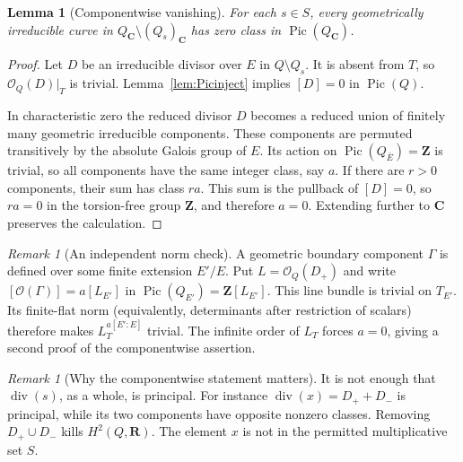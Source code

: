\documentclass[11pt,a4paper]{article}
\newtheorem{lemma}[theorem]{Lemma}
\theoremstyle{remark}
\newtheorem{remark}[theorem]{Remark}
\newcommand{\Z}{\mathbf Z}
\newcommand{\R}{\mathbf R}
\newcommand{\C}{\mathbf C}
\newcommand{\OO}{\mathcal O}
\newcommand{\Pic}{\operatorname{Pic}}
\newcommand{\divisor}{\operatorname{div}}
\begin{document}
\begin{lemma}[Componentwise vanishing]\label{lem:components}
For each $s\in S$, every geometrically irreducible curve in $Q_{\C}\setminus(Q_s)_{\C}$ has zero class in $\Pic(Q_{\C})$.
\end{lemma}
\begin{proof}
Let $D$ be an irreducible divisor over $E$ in $Q\setminus Q_s$. It is absent from $T$, so $\OO_Q(D)|_T$ is trivial. Lemma~\ref{lem:Picinject} implies $[D]=0$ in $\Pic(Q)$.

In characteristic zero the reduced divisor $D$ becomes a reduced union of finitely many geometric irreducible components. These components are permuted transitively by the absolute Galois group of $E$. Its action on $\Pic(Q_{\overline E})=\Z$ is trivial, so all components have the same integer class, say $a$. If there are $r>0$ components, their sum has class $ra$. This sum is the pullback of $[D]=0$, so $ra=0$ in the torsion-free group $\Z$, and therefore $a=0$. Extending further to $\C$ preserves the calculation.
\end{proof}

\begin{remark}[An independent norm check]
A geometric boundary component $\Gamma$ is defined over some finite
extension $E'/E$. Put $L=\OO_Q(D_+)$ and write
$[\OO(\Gamma)]=a[L_{E'}]$ in $\Pic(Q_{E'})=\Z[L_{E'}]$.
This line bundle is trivial on $T_{E'}$. Its finite-flat norm
(equivalently, determinants after restriction of scalars) therefore
makes $L_T^{a[E':E]}$ trivial. The infinite order of $L_T$ forces
$a=0$, giving a second proof of the componentwise assertion.
\end{remark}

\begin{remark}[Why the componentwise statement matters]
It is not enough that $\divisor(s)$, as a whole, is principal. For instance $\divisor(x)=D_++D_-$ is principal, while its two components have opposite nonzero classes. Removing $D_+\cup D_-$ kills $H^2(Q,\R)$. The element $x$ is not in the permitted multiplicative set $S$.
\end{remark}
\end{document}
